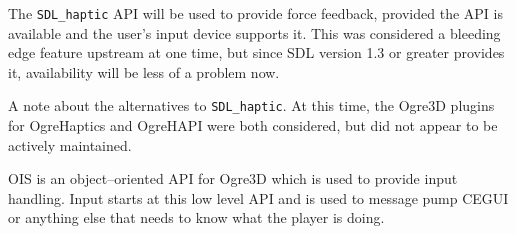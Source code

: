 

\startitemize[4]

The {\tt SDL_haptic} API will be used to provide force feedback, provided the API is available and the user's input device supports it. This was considered a bleeding edge feature upstream at one time, but since SDL version 1.3 or greater provides it, availability will be less of a problem now.

A note about the alternatives to {\tt SDL_haptic}. At this time, the Ogre3D plugins for OgreHaptics and OgreHAPI were both considered, but did not appear to be actively maintained.


OIS is an object--oriented API for Ogre3D which is used to provide input handling. Input starts at this low level API and is used to message pump CEGUI or anything else that needs to know what the player is doing.
\stopitemize

